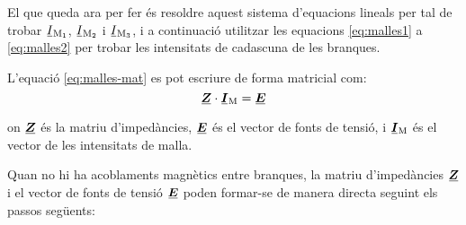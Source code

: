 El que queda ara per fer és resoldre aquest sistema d'equacions lineals per tal de trobar $\cmplx{I}\ped{M_1}$, $\cmplx{I}\ped{M_2}$ i $\cmplx{I}\ped{M_3}$, i a continuació utilitzar les equacions \eqref{eq:malles1} a \eqref{eq:malles2} per trobar les intensitats de cadascuna de les branques.

L'equació \eqref{eq:malles-mat} es pot escriure de forma matricial com:
\begin{equation}
  \mcmplx{Z} \cdot\mcmplx{I}\ped{M} = \mcmplx{E}
\end{equation}

on  $\mcmplx{Z}$ és la matriu d'impedàncies, $\mcmplx{E}$ és el vector de fonts de tensió, i $\mcmplx{I}\ped{M}$ és el vector de les intensitats de malla.

 Quan no hi ha acoblaments magnètics entre branques, la matriu d'impedàncies $\mcmplx{Z}$ i el vector de fonts de tensió $\mcmplx{E}$ poden formar-se de manera directa seguint els passos següents:
